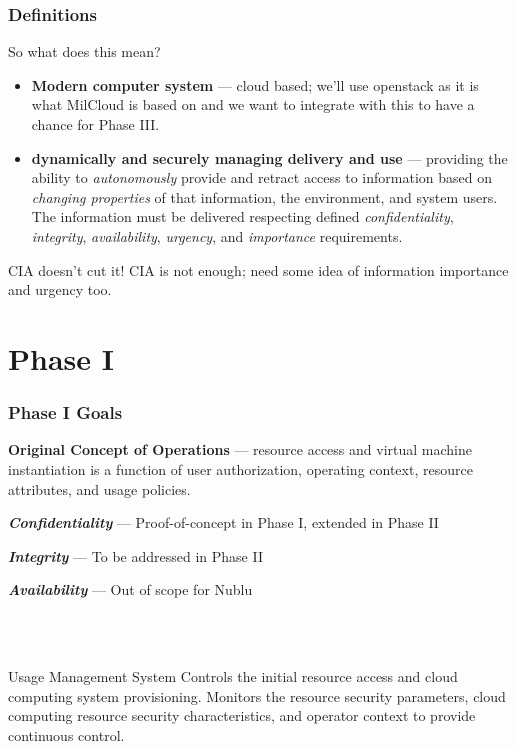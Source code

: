 \documentclass[t,handout]{beamer}
\begin{document}
\begin{frame}
\frametitle{Definitions}
So what does this mean? \\
\begin{itemize}
\item {\small {\bf Modern computer system} --- cloud based; we'll use openstack as it is what MilCloud is based on and we want to integrate with this to have a chance for Phase III.}
\item {\small {\bf dynamically and securely managing delivery and use} --- providing the ability to {\sl autonomously} provide and retract access to information based on {\sl changing properties} of that information, the environment, and system users.  The information must be delivered respecting defined {\sl confidentiality}, {\sl integrity}, {\sl availability}, {\sl urgency}, and {\sl importance} requirements.}
\end{itemize}
\begin{beamerboxesrounded}[shadow]{CIA doesn't cut it!}
{\small CIA is not enough; need some idea of information importance and urgency too.}
\end{beamerboxesrounded}
\end{frame}

\section{Phase I}

\begin{frame}
\frametitle{Phase I Goals}
{\bf Original Concept of Operations} --- resource access and virtual machine instantiation is a function of user authorization, operating context, resource attributes, and usage policies.

\begin{itemize}
{\small
\item \textit{\textbf{Confidentiality}} --- Proof-of-concept in Phase I, extended in Phase II
\item \textit{\textbf{Integrity}} --- To be addressed in Phase II
\item \textit{\textbf{Availability}} --- Out of scope for Nublu
}
\end{itemize}
~\\~\\

\begin{beamerboxesrounded}[shadow]{Usage Management System}
Controls the initial resource access and cloud computing system provisioning.
Monitors the resource security parameters, cloud computing resource security characteristics, and operator context to provide continuous control.
\end{beamerboxesrounded}

\end{frame}
\end{document}
